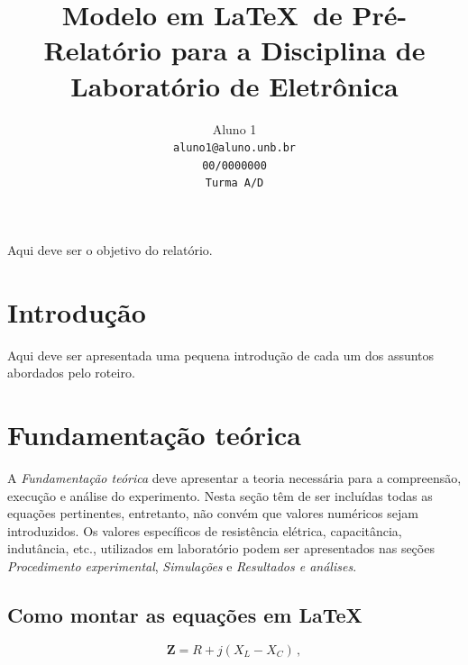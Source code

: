 \documentclass[10pt,twocolumn,letterpaper]{article}
\begin{document}
\title{Modelo em \LaTeX\ de Pré-Relatório para a Disciplina de Laboratório de Eletrônica}

\author{Aluno 1\\
{\tt\small aluno1@aluno.unb.br}\\
{\tt\small 00/0000000}\\
{\tt\small Turma A/D}
}

\maketitle


\begin{objetivo}
Aqui deve ser o objetivo do relatório.

\end{objetivo}

\section{Introdução}
Aqui deve ser apresentada uma pequena introdução de cada um dos assuntos abordados pelo roteiro.

\section{Fundamentação teórica}

A {\em Fundamentação teórica} deve apresentar a teoria necessária para a compreensão, execução e análise do experimento. Nesta seção têm de ser incluídas todas as equações pertinentes, entretanto, não convém que valores numéricos sejam introduzidos. Os valores específicos de resistência elétrica, capacitância, indutância, etc., utilizados em la\-bo\-ra\-tó\-rio podem ser apresentados nas seções {\em Procedimento experimental}, {\em Simulações} e {\em Resultados e análises}. 

\subsection{Como montar as equações em \LaTeX}

\begin{equation} \label{eq:imped}
\mathbf{Z} = R + j(X_L - X_C) \, ,
\end{equation}
\end{document}
